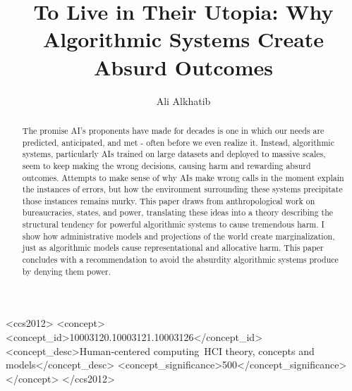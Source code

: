\documentclass[manuscript,screen]{acmart}
\newcommand{\onlyinsubfile}[1]{#1}
\newcommand{\topic}[1]{{\color{blue}{#1}}}
\newcommand{\notinsubfile}[1]{}
\begin{document}
\renewcommand{\notinsubfile}[1]{#1}
\renewcommand{\onlyinsubfile}[1]{}
\renewcommand{\topic}[1]{#1}
\title[To Live in Their Utopia]{To Live in Their Utopia: Why Algorithmic Systems Create Absurd Outcomes}

\author{Ali Alkhatib}


\renewcommand{\shortauthors}{Alkhatib}

\begin{abstract}
  The promise AI's proponents have made for decades is one in which our needs are predicted, anticipated, and met - often before we even realize it.
  Instead, algorithmic systems, particularly AIs trained on large datasets and deployed to massive scales, seem to keep making the wrong decisions, causing harm and rewarding absurd outcomes.
  Attempts to make sense of why AIs make wrong calls in the moment explain the instances of errors,
  but how the environment surrounding these systems precipitate those instances remains murky.
  This paper draws from anthropological work on bureaucracies, states, and power,
  translating these ideas into a theory describing the structural tendency for powerful algorithmic systems to cause tremendous harm.
  I show how administrative models and projections of the world create marginalization, just as algorithmic models cause representational and allocative harm.
  This paper concludes with a recommendation to avoid the absurdity algorithmic systems produce by denying them power.
\end{abstract}

\begin{CCSXML}
<ccs2012>
   <concept>
       <concept_id>10003120.10003121.10003126</concept_id>
       <concept_desc>Human-centered computing~HCI theory, concepts and models</concept_desc>
       <concept_significance>500</concept_significance>
       </concept>
 </ccs2012>
\end{CCSXML}
\end{document}
